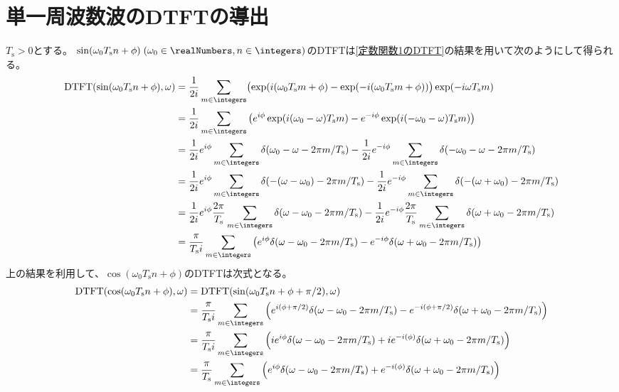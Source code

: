 			\section{単一周波数波のDTFTの導出}
				\newcommand{\Ts}{T_\text{s}}
				$T_\text{s}>0$とする。
				$\sin(\omega_0 T_\text{s} n + \phi)\;(\omega_0\in\realNumbers, n\in\integers)$のDTFTは\ref{定数関数1のDTFT}の結果を用いて次のようにして得られる。
				\begin{align*}
					\text{DTFT}(\sin(\omega_0 T_\text{s} n + \phi), \omega) &= \frac{1}{2i}\sum_{m\in\integers} \bigl(\exp(i(\omega_0\Ts m + \phi) - \exp(-i(\omega_0\Ts m + \phi))\bigr)\exp(-i\omega\Ts m) \\
					&= \frac{1}{2i}\sum_{m\in\integers} \left(e^{i\phi}\exp(i(\omega_0-\omega)\Ts m) - e^{-i\phi}\exp(i(-\omega_0-\omega)\Ts m)\right) \\
					&= \frac{1}{2i}e^{i\phi}\sum_{m\in\integers}\delta(\omega_0-\omega - 2\pi m/\Ts) - \frac{1}{2i}e^{-i\phi}\sum_{m\in\integers}\delta(-\omega_0-\omega - 2\pi m/\Ts) \\
					&= \frac{1}{2i}e^{i\phi}\sum_{m\in\integers}\delta(-(\omega-\omega_0) - 2\pi m/\Ts) - \frac{1}{2i}e^{-i\phi}\sum_{m\in\integers}\delta(-(\omega+\omega_0) - 2\pi m/\Ts) \\
					&= \frac{1}{2i}e^{i\phi}\frac{2\pi}{\Ts}\sum_{m\in\integers}\delta(\omega-\omega_0 - 2\pi m/\Ts) - \frac{1}{2i}e^{-i\phi}\frac{2\pi}{\Ts}\sum_{m\in\integers}\delta(\omega+\omega_0 - 2\pi m/\Ts) \\
					&= \frac{\pi}{\Ts i}\sum_{m\in\integers}\left(e^{i\phi}\delta(\omega-\omega_0 - 2\pi m/\Ts) - e^{-i\phi}\delta(\omega+\omega_0 - 2\pi m/\Ts)\right)
				\end{align*}
				上の結果を利用して、$\cos(\omega_0 T_\text{s} n + \phi)$のDTFTは次式となる。
				\begin{align*}
					\text{DTFT}(\cos(\omega_0 T_\text{s} n + \phi), \omega) &= \text{DTFT}(\sin(\omega_0 T_\text{s} n + \phi + \pi/2), \omega) \\
					&= \frac{\pi}{\Ts i}\sum_{m\in\integers}\left(e^{i(\phi+\pi/2)}\delta(\omega-\omega_0 - 2\pi m/\Ts) - e^{-i(\phi+\pi/2)}\delta(\omega+\omega_0 - 2\pi m/\Ts)\right) \\
					&= \frac{\pi}{\Ts i}\sum_{m\in\integers}\left(ie^{i\phi}\delta(\omega-\omega_0 - 2\pi m/\Ts) + ie^{-i(\phi)}\delta(\omega+\omega_0 - 2\pi m/\Ts)\right) \\
					&= \frac{\pi}{\Ts}\sum_{m\in\integers}\left(e^{i\phi}\delta(\omega-\omega_0 - 2\pi m/\Ts) + e^{-i(\phi)}\delta(\omega+\omega_0 - 2\pi m/\Ts)\right)
				\end{align*}
				\let\Ts\undefined
